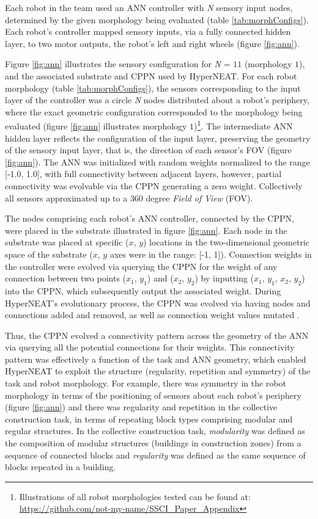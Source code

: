 \documentclass[conference]{IEEEtran}
\begin{document}
Each robot in the team used an ANN controller with
\textit{N} sensory input nodes, determined by the given morphology being evaluated (table \ref{tab:morphConfigs}).
Each robot's controller mapped sensory inputs, via a fully connected hidden layer, to two motor outputs, the
robot's left and right wheels (figure \ref{fig:ann}). %

Figure \ref{fig:ann} illustrates the sensory configuration for \textit{N} = $11$ (morphology $1$), and the
associated substrate and CPPN used by HyperNEAT.
For each robot morphology (table \ref{tab:morphConfigs}), the sensors corresponding to the input layer
of the controller was a circle \textit{N} nodes distributed about a robot's periphery,
where the exact geometric configuration corresponded to the morphology being evaluated
(figure \ref{fig:ann} illustrates morphology
$1$)\footnote{Illustrations of all robot morphologies tested can be found at: \url{https://github.com/not-my-name/SSCI_Paper_Appendix}}.
The intermediate ANN hidden layer reflects the configuration of the input layer, preserving
the geometry of the sensory input layer, that is, the direction of each sensor's FOV (figure
\ref{fig:ann}).
The ANN was initialized with random weights normalized to the range [-1.0, 1.0], with full connectivity between adjacent layers,
however, partial connectivity was evolvable via the CPPN generating a zero weight.
Collectively all sensors approximated up to a $360$ degree \textit{Field of View} (FOV).

The nodes comprising each robot's ANN controller, connected by the CPPN, were placed in the substrate
illustrated in figure \ref{fig:ann}.
Each node in the substrate was placed at specific ($x$, $y$) locations in the two-dimensional geometric space
of the substrate ($x$, $y$ axes were in the range: [-1, 1]).
Connection weights in the controller were evolved via querying the CPPN for the weight of any connection
between two points ($x_{1}$, $y_{1}$) and ($x_{2}$, $y_{2}$) by inputting ($x_{1}$, $y_{1}$, $x_{2}$, $y_{2}$)
into the CPPN, which subsequently output the associated weight.
During HyperNEAT's evolutionary process, the CPPN was evolved via having nodes and connections added and removed, as well
as connection weight values mutated \cite{StanleyDAmbrosioGauci2009}.

Thus, the CPPN evolved a connectivity pattern across the geometry of the ANN via querying all the potential
connections for their weights.
This connectivity pattern was effectively a function of the task and ANN geometry,
which enabled HyperNEAT to exploit the structure (regularity, repetition and symmetry) of the task and robot morphology.
For example, there was symmetry in the robot morphology in terms of the positioning of sensors about each
robot's periphery (figure \ref{fig:ann}) and there was regularity and repetition in the collective construction
task, in terms of repeating block types comprising modular and regular structures.
In the collective construction task, \textit{modularity} was defined as the composition of modular structures
(buildings in construction zones) from a sequence of connected blocks and \textit{regularity} was defined
as the same sequence of blocks repeated in a building.
\end{document}

